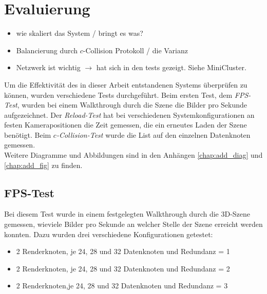 \chapter{Evaluierung}
\label{chap:eval}
%
\begin{itemize}
 \item wie skaliert das System / bringt es was?
 \item Balancierung durch $c$-Collision Protokoll / die Varianz
 \item Netzwerk ist wichtig $\rightarrow$ hat sich in den tests gezeigt. Siehe MiniCluster.
\end{itemize}
%
%

Um die Effektivität des in dieser Arbeit entstandenen Systems überprüfen zu können, wurden verschiedene Tests durchgeführt.
Beim ersten Test, dem \textit{FPS-Test}, wurden bei einem Walkthrough durch die Szene die Bilder pro Sekunde aufgezeichnet. Der \textit{Reload-Test} hat bei verschiedenen Systemkonfigurationen an festen Kamerapositionen die Zeit gemessen, die ein erneutes Laden der Szene benötigt. Beim \textit{$c$-Collision-Test} wurde die List auf den einzelnen Datenknoten gemessen.\\
Weitere Diagramme und Abbildungen sind in den Anhängen \ref{chap:add_diag} und \ref{chap:add_fig} zu finden.

\section{FPS-Test}
\label{sec:eval:fps}

Bei diesem Test wurde in einem festgelegten Walkthrough durch die 3D-Szene gemessen, wieviele Bilder pro Sekunde an welcher Stelle der Szene erreicht werden konnten. Dazu wurden drei verschiedene Konfigurationen getestet:
\begin{itemize}
  \item 2 Renderknoten, je 24, 28 und 32 Datenknoten und Redundanz = 1 
  \item 2 Renderknoten, je 24, 28 und 32 Datenknoten und Redundanz = 2
  \item 2 Renderknoten,je 24, 28 und 32 Datenknoten und Redundanz = 3
\end{itemize}

